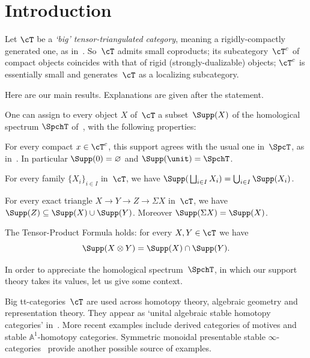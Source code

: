 \section{Introduction}

\begin{Hyp}
\label{Hyp:big-tt}
Let $\cT$ be a \emph{`big' tensor-triangulated category}, meaning a rigidly-compactly generated one, as in~\cite{BalmerFavi11}. So~$\cT$ admits small coproducts; its subcategory~$\cT^c$ of compact objects coincides with that of rigid (strongly-dualizable) objects; $\cT^c$ is essentially small and generates~$\cT$ as a localizing subcategory.
\end{Hyp}

Here are our main results. Explanations are given after the statement.
\begin{Thm}
\label{Thm:support-intro}
One can assign to every object $X$ of~$\cT$ a subset~$\Supp(X)$ of the homological spectrum $\SpchT$ of~\cite{Balmer20a}, with the following properties:
\begin{enumeratea}

\item
\label{it:support-agree}
For every compact $x\in \cT^c$, this support agrees with the usual one in~$\SpcT$, as in~\cite{Balmer05a}. In particular $\Supp(0)=\varnothing$ and $\Supp(\unit)=\SpchT$.

\item
\label{it:support-coprod}
For every family $\{X_i\}_{i\in I}$ in~$\cT$, we have $\Supp(\,\bigsqcup_{i\in I}X_i)=\bigcup_{i\in I}\Supp(X_i)$.

\item
\label{it:support-triangle}
For every exact triangle $X\to Y\to Z\to \Sigma X$ in~$\cT$, we have $\Supp(Z)\subseteq\Supp(X)\cup \Supp(Y)$. Moreover $\Supp(\Sigma X)=\Supp(X)$.

\item
\label{it:support-TPF}
The Tensor-Product Formula holds: for every $X,Y\in\cT$ we have
\begin{equation*}
\Supp(X\otimes Y)=\Supp(X)\cap \Supp(Y).
\end{equation*}
\end{enumeratea}
\end{Thm}

In order to appreciate the homological spectrum~$\SpchT$, in which our support theory takes its values, let us give some context.

Big tt-categories~$\cT$ are used across homotopy theory, algebraic geometry and representation theory. They appear as `unital algebraic stable homotopy categories' in~\cite{HoveyPalmieriStrickland97}. More recent examples include derived categories of motives and stable $\mathbb{A}^{\!1}$-homotopy categories. Symmetric monoidal presentable stable $\infty$-categories~\cite{LurieHA} provide another possible source of examples.


